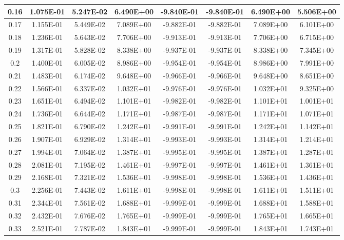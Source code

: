 \documentclass{article}
\begin{document}
\begin{center}
\begin{longtable}{|c|c|c|c|c|c|c|c|}
    0.16 & 1.075E-01 & 5.247E-02 & 6.490E+00 & -9.840E-01 & -9.840E-01 & 6.490E+00 & 5.506E+00 \\ \hline
    0.17 & 1.155E-01 & 5.449E-02 & 7.089E+00 & -9.882E-01 & -9.882E-01 & 7.089E+00 & 6.101E+00 \\ \hline
    0.18 & 1.236E-01 & 5.643E-02 & 7.706E+00 & -9.913E-01 & -9.913E-01 & 7.706E+00 & 6.715E+00 \\ \hline
    0.19 & 1.317E-01 & 5.828E-02 & 8.338E+00 & -9.937E-01 & -9.937E-01 & 8.338E+00 & 7.345E+00 \\ \hline
    0.2 & 1.400E-01 & 6.005E-02 & 8.986E+00 & -9.954E-01 & -9.954E-01 & 8.986E+00 & 7.991E+00 \\ \hline
    0.21 & 1.483E-01 & 6.174E-02 & 9.648E+00 & -9.966E-01 & -9.966E-01 & 9.648E+00 & 8.651E+00 \\ \hline
    0.22 & 1.566E-01 & 6.337E-02 & 1.032E+01 & -9.976E-01 & -9.976E-01 & 1.032E+01 & 9.325E+00 \\ \hline
    0.23 & 1.651E-01 & 6.494E-02 & 1.101E+01 & -9.982E-01 & -9.982E-01 & 1.101E+01 & 1.001E+01 \\ \hline
    0.24 & 1.736E-01 & 6.644E-02 & 1.171E+01 & -9.987E-01 & -9.987E-01 & 1.171E+01 & 1.071E+01 \\ \hline
    0.25 & 1.821E-01 & 6.790E-02 & 1.242E+01 & -9.991E-01 & -9.991E-01 & 1.242E+01 & 1.142E+01 \\ \hline
    0.26 & 1.907E-01 & 6.929E-02 & 1.314E+01 & -9.993E-01 & -9.993E-01 & 1.314E+01 & 1.214E+01 \\ \hline
    0.27 & 1.994E-01 & 7.064E-02 & 1.387E+01 & -9.995E-01 & -9.995E-01 & 1.387E+01 & 1.287E+01 \\ \hline
    0.28 & 2.081E-01 & 7.195E-02 & 1.461E+01 & -9.997E-01 & -9.997E-01 & 1.461E+01 & 1.361E+01 \\ \hline
    0.29 & 2.168E-01 & 7.321E-02 & 1.536E+01 & -9.998E-01 & -9.998E-01 & 1.536E+01 & 1.436E+01 \\ \hline
    0.3 & 2.256E-01 & 7.443E-02 & 1.611E+01 & -9.998E-01 & -9.998E-01 & 1.611E+01 & 1.511E+01 \\ \hline
    0.31 & 2.344E-01 & 7.561E-02 & 1.688E+01 & -9.999E-01 & -9.999E-01 & 1.688E+01 & 1.588E+01 \\ \hline
    0.32 & 2.432E-01 & 7.676E-02 & 1.765E+01 & -9.999E-01 & -9.999E-01 & 1.765E+01 & 1.665E+01 \\ \hline
    0.33 & 2.521E-01 & 7.787E-02 & 1.843E+01 & -9.999E-01 & -9.999E-01 & 1.843E+01 & 1.743E+01 \\ \hline

\end{longtable}
\end{center}
\end{document}
